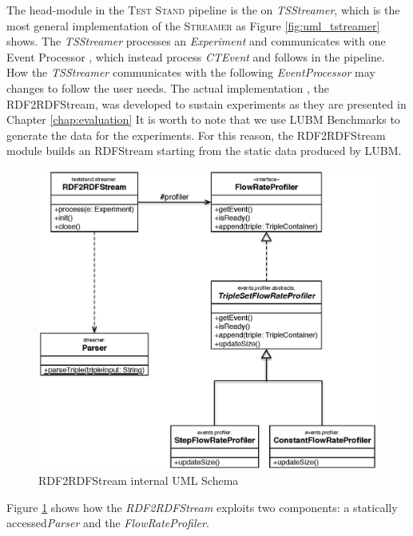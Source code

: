 The head-module in the \textsc{Test Stand} pipeline is the on \textit{TSStreamer}, which is the most general implementation of the \textsc{Streamer} as Figure \ref{fig:uml_tstreamer} shows. The \textit{TSStreamer} processes an \textit{Experiment} and communicates with one Event Processor , which instead process \textit{CTEvent} and follows in the pipeline. How the \textit{TSStreamer} communicates with the following \textit{EventProcessor} may changes to follow the user needs. The actual implementation , the RDF2RDFStream, was developed to sustain experiments as they are presented in Chapter \ref{chap:evaluation}
It is worth to note that we use LUBM Benchmarks to generate the data for the experiments. For this reason, the RDF2RDFStream module builds an RDFStream starting from the static data produced by LUBM.

\begin{figure}[tbh]
  \centering
	\includegraphics[width=0.75\linewidth]{images/uml_flowrateprofiler}
	\caption{RDF2RDFStream internal UML Schema} 
  	\label{fig:uml_flowrateprofiler}
\end{figure}


Figure \ref{fig:uml_flowrateprofiler} shows how the \textit{RDF2RDFStream} exploits two components: a statically accessed\textit{Parser} and the \textit{FlowRateProfiler}. 

